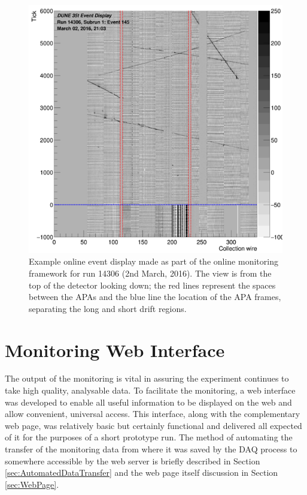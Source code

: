 \begin{figure}[p]
  \centering
  \includegraphics[width=14cm]{evd.png}
  \caption[Example online event display made by the Online Monitoring framework]{Example online event display made as part of the online monitoring framework for run 14306 (2nd March, 2016).  The view is from the top of the detector looking down; the red lines represent the spaces between the APAs and the blue line the location of the APA frames, separating the long and short drift regions.}
  \label{fig:EVD}
\end{figure}

\section{Monitoring Web Interface}\label{sec:WebInterface}

The output of the monitoring is vital in assuring the experiment continues to take high quality, analysable data.  To facilitate the monitoring, a web interface was developed to enable all useful information to be displayed on the web and allow convenient, universal access.  This interface, along with the complementary web page, was relatively basic but certainly functional and delivered all expected of it for the purposes of a short prototype run.  The method of automating the transfer of the monitoring data from where it was saved by the DAQ process to somewhere accessible by the web server is briefly described in Section \ref{sec:AutomatedDataTransfer} and the web page itself discussion in Section \ref{sec:WebPage}.

